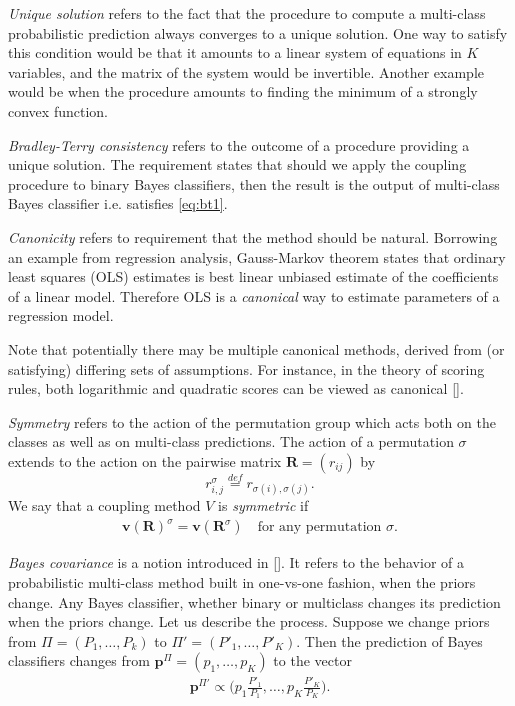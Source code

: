 \documentclass[twoside,11pt]{article}
\begin{document}
\emph{Unique solution} refers to the fact that the procedure to compute a multi-class probabilistic prediction always converges to a unique solution. One way to satisfy this condition would be that it amounts to a linear system of equations in $K$ variables, and the matrix of the system would be invertible. Another example would be when the procedure amounts to finding the minimum of a strongly convex function. 

\emph{Bradley-Terry consistency} refers to the outcome of a procedure providing a unique solution. The requirement states that should we apply the coupling procedure to binary Bayes classifiers, then the result is the output of multi-class Bayes classifier i.e. satisfies \eqref{eq:bt1}.

\emph{Canonicity} refers to requirement that the method should be natural. Borrowing an example from regression analysis, Gauss-Markov theorem states that ordinary least squares (OLS) estimates is best linear unbiased estimate of the coefficients of a linear model. Therefore OLS  is a \emph{canonical} way to estimate parameters of a regression model. 

Note that potentially there may be multiple canonical methods, derived from (or satisfying) differing sets of assumptions. For instance, in the theory of scoring rules, both logarithmic and quadratic scores can be viewed as canonical [\cite{shannon1948mathematical,selten1998axiomatic}].

\emph{Symmetry} refers to the action of the permutation group which acts both on the classes as well as on multi-class predictions. The action of a permutation $\sigma$ extends to the action on the pairwise matrix $\boldsymbol{R} = (r_{ij})$ by 
\begin{equation}
	 r^\sigma_{i,j} \stackrel{def}{=}  r_{\sigma(i), \sigma(j)}.
\end{equation}
We say that a coupling method $V$ is \emph{symmetric} if 
\begin{align}
		\boldsymbol{v}(\boldsymbol{R})^\sigma = \boldsymbol{v}(\boldsymbol{R}^\sigma)\quad\textrm{for any permutation $\sigma$}.
\end{align}

\emph{Bayes covariance} is a notion introduced in  [\cite{vsuch2016bayes}]. It refers to the behavior of a probabilistic multi-class method built in one-vs-one fashion, when the priors change. Any Bayes classifier, whether binary or multiclass changes its prediction when the priors change. Let us describe the process. Suppose we change priors from $\Pi = (P_1, \ldots, P_k)$ to $\Pi'= (P'_1, \ldots, P'_K)$. Then the prediction of Bayes classifiers changes from $\boldsymbol{p}^\Pi= (p_1, \ldots, p_K)$ to the vector 
\begin{align}
\boldsymbol{p}^{\Pi'} \propto \biggl(p_1 \frac{P'_1}{P_1}, \ldots, p_K \frac{P'_K}{P_K}\biggr). \label{eq:changePrior}
\end{align}
\end{document}
